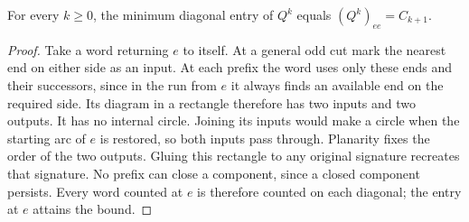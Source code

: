 \begin{corollary}\label{cor:minimum-return}
For every \(k\ge0\), the minimum diagonal entry of \(Q^k\) equals
\((Q^k)_{ee}=C_{k+1}\).
\end{corollary}
\begin{proof}
Take a word returning \(e\) to itself. At a general odd cut mark the
nearest end on either side as an input. At each prefix the word uses only
these ends and their successors, since in the run from \(e\) it always
finds an available end on the required side. Its diagram in a rectangle
therefore has two inputs and two outputs. It has no internal circle.
Joining its inputs would make a circle when the starting arc of \(e\)
is restored, so both inputs pass through. Planarity fixes the order of
the two outputs. Gluing this rectangle to any original signature recreates
that signature. No prefix can close a component, since a closed component
persists. Every word counted at \(e\) is therefore counted on each
diagonal; the entry at \(e\) attains the bound.
\end{proof}
